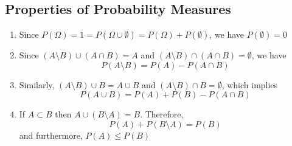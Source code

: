\documentclass[openany]{report}
\begin{document}
\subsection{Properties of Probability Measures}
\begin{enumerate}[label=(\roman*)]
    \item Since $P(\Omega) = 1 = P(\Omega \cup \emptyset) = P(\Omega) + P(\emptyset)$, we have $P(\emptyset) = 0$
    \item Since $(A\setminus B) \cup (A \cap B) = A$ and $(A\setminus B) \cap (A \cap B) = \emptyset$, we have
    \[P(A \setminus B) = P(A) - P(A \cap B)\]
    \item Similarly, $(A \setminus B) \cup B = A \cup B$ and $(A \setminus B) \cap B = \emptyset$, which implies 
    \[P(A \cup B) = P(A) + P(B) - P(A \cap B)\]
    \item If $A \subset B$ then $A \cup (B \setminus A) = B$. Therefore, 
    \[P(A) + P(B \setminus A) = P(B)\]
    and furthermore,
    $P(A) \leq P(B)$
\end{enumerate}
\end{document}
